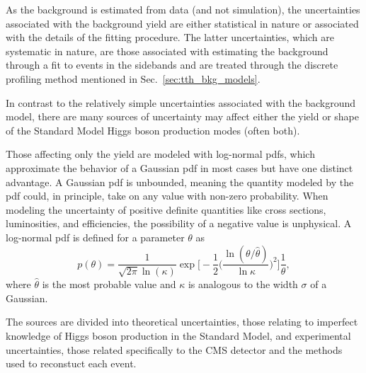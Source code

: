 As the background is estimated from data (and not simulation), the uncertainties associated with the background yield are either statistical in nature or associated with the details of the fitting procedure.
The latter uncertainties, which are systematic in nature, are those associated with estimating the background through a fit to events in the \mgg sidebands and are treated through the discrete profiling method mentioned in Sec.~\ref{sec:tth_bkg_models}.

In contrast to the relatively simple uncertainties associated with the background model, there are many sources of uncertainty may affect either the yield or \mgg shape of the Standard Model Higgs boson production modes (often both).

Those affecting only the yield are modeled with log-normal pdfs, which approximate the behavior of a Gaussian pdf in most cases but have one distinct advantage.
A Gaussian pdf is unbounded, meaning the quantity modeled by the pdf could, in principle, take on any value with non-zero probability.
When modeling the uncertainty of positive definite quantities like cross sections, luminosities, and efficiencies, the possibility of a negative value is unphysical.
A log-normal pdf is defined for a parameter $\theta$ as
\begin{equation} \label{eqn:tth_log_normal}
    p(\theta) = \frac{1}{\sqrt{2\pi} \ln(\kappa)} \exp \bigg[ -\frac{1}{2} \bigg(\frac{\ln(\theta/\hat{\theta})}{ \ln\kappa} \bigg)^2 \bigg] \frac{1}{\theta},
\end{equation}
where $\hat{\theta}$ is the most probable value and $\kappa$ is analogous to the width $\sigma$ of a Gaussian.


The sources are divided into theoretical uncertainties, those relating to imperfect knowledge of Higgs boson production in the Standard Model, and experimental uncertainties, those related specifically to the CMS detector and the methods used to reconstuct each event.

